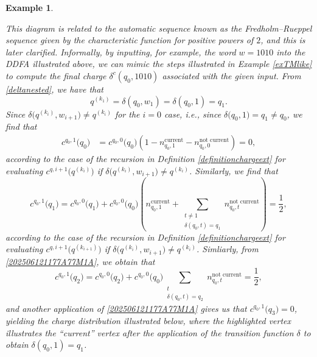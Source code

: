 \documentclass[12pt]{article}
\newtheorem{example}{Example}
\begin{document}
\begin{example}
\begin{center}
\end{center}
 This diagram is related to the automatic sequence known as the Fredholm--Rueppel sequence given by the characteristic function for 
 positive powers of $2$, and this is later clarified. 
 Informally, by inputting, for example, the word $w = 1010$ into 
 the DDFA illustrated above, 
 we can mimic the steps illustrated in Example \ref{exTMlike} 
 to compute the final charge $\delta^{c}(q_0, 1010)$
 associated with the given input. 
 From \eqref{deltanested}, we have that 
\begin{equation*}
 q^{(k_1)} = \delta(q_0, w_1) = \delta(q_0, 1) = q_{1}. 
\end{equation*}
 Since $\delta\big( q^{(k_i)}, w_{i + 1} \big) \neq q^{(k_i)}$ 
 for the $i = 0$ case, 
 i.e., since 
 $\delta\big( q_{0}, 1 \big) = q_{1} \neq q_{0}$,
 we find that 
\begin{align*}
 c^{q_0, 1}\big( q_{0} \big) 
 & = c^{q_0, 0}\big( q_{0} \big) \left( 1 - n^{\text{current}}_{q_{0}, 1} 
 - n_{q_{0}, 0}^{\text{not current}} \right) = 0, 
\end{align*}
 according to the case of the recursion in Definition \ref{definitionchargeext}
 for evaluating $c^{q, i+1}\big( q^{(k_i)} \big)$
 if $\delta\big( q^{(k_i)}, w_{i+1} \big) \neq q^{(k_i)}$. 
 Similarly, we find that 
 $$ c^{q_0, 1}\big( q_1 \big) = 
 c^{q_0, 0}\big( q_1 \big) + c^{q_0, 0}\big( q_0 \big) \left( n^{\text{current}}_{q_0, 1} 
 + \sum_{ \substack{ t \neq 1 \\ \delta(q_0, t) = q_1 } } n_{{q_0}, t}^{\text{not current}} \right) = \frac{1}{2}, $$
 according to the case of the recursion in Definition \ref{definitionchargeext}
 for evaluating
 $c^{q, i+1}\big( q^{(k_{i+1})} \big)$
 if $\delta\big( q^{(k_i)}, w_{i+1} \big) \neq q^{(k_i)}$. Simliarly, from \eqref{202506121177A77M1A}, 
 we obtain that 
\begin{equation*}
 c^{q_0, 1}\big( q_2 \big) = c^{q_0, 0}\big( q_2 \big) 
 + c^{q_0, 0}\big( q_0 \big) \sum_{\substack{t \\ \delta\left( q_0, t \right) 
 = q_2 }} n_{q_0, t}^{\text{not current}} = \frac{1}{2}, 
\end{equation*}
 and another application of 
 \eqref{202506121177A77M1A} gives us that
 $c^{q_0, 1}\big( q_{3} \big) = 0$, yielding the charge distribution illustrated below, 
 where the highlighted vertex illustrates the ``current'' vertex after the application of the transition
 function $\delta$ to obtain $\delta(q_0, 1) = q_1$. 
\begin{center}
\begin{tikzpicture} [draw=black!80!black,
 node distance = 3cm, 
 on grid, 
 auto,
 every loop/.style={stealth-}]
 

\end{tikzpicture}
\end{center}
\end{example}
\end{document}
